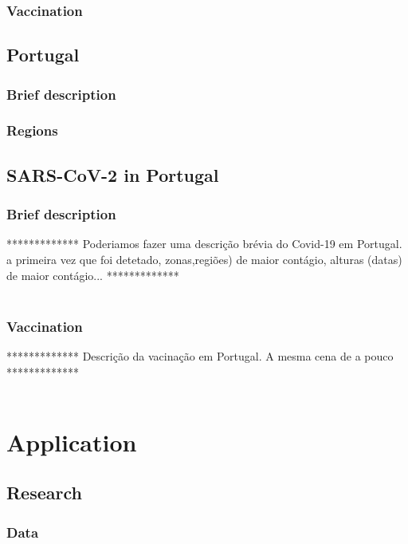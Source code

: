 \documentclass[11pt,a4paper]{report}
\begin{document}


\subsection{Vaccination}



\section{Portugal}

\subsection{Brief description}


\subsection{Regions}


\section{SARS-CoV-2 in Portugal}
\subsection{Brief description}
    ************* Poderiamos fazer uma descrição brévia do Covid-19 em Portugal. a primeira vez que foi detetado, zonas,regiões) de maior contágio, alturas (datas) de maior contágio...   *************\\ \\
\subsection{Vaccination}
    ************* Descrição da vacinação em Portugal. A mesma cena de a pouco  *************\\ \\

\chapter{Application}
\section{Research}
\subsection{Data}
\end{document}
